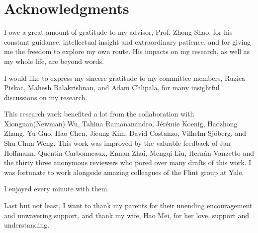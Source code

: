 

\chapter*{Acknowledgments}
\thispagestyle{empty}

I owe a great amount of gratitude to my advisor, Prof. Zhong Shao, for
his constant guidance, intellectual insight and extraordinary patience,
and for giving me the freedom to explore my own route.
His impacts on my research, as well as my whole life, are beyond words.

I would like to express my sincere gratitude to my committee members,
Ruzica Piskac, Mahesh Balakrishnan, and Adam Chlipala, for many insightful
discussions on my research.

This research work benefited a lot from 
the collaboration with Xiongnan(Newman) Wu,
Tahina Ramananandro,
J\'{e}r\'{e}mie Koenig,
Haozhong Zhang,
Yu Guo,
Hao Chen,
Jieung Kim,
David Costanzo,
Vilhelm Sj\"{o}berg,
and Shu-Chun Weng.
This work was improved by the valuable feedback of 
Jan Hoffmann,
Quentin Carbonneaux,
Ennan Zhai, Mengqi Liu,
Hern\'{a}n Vanzetto
and the thirty three anonymous reviewers who pored over many drafts
of this work.
I was fortunate to work alongside 
amazing colleagues of the Flint group at Yale. 
I enjoyed every minute with them.

Last but not least, I want to thank my parents 
for their unending encouragement and unwavering support, 
and thank my wife, Hao Mei,
for her love, support and understanding.

\clearpage
